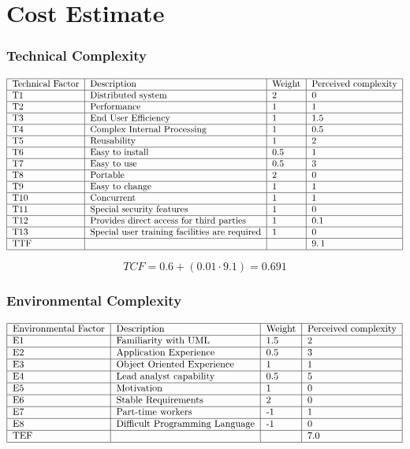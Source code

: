 \documentclass{article}
\begin{document}
\newpage

\part{Cost Estimate}

\section{Technical Complexity}

\[
\begin{tabular}{|l|l|l|l|}
\hline
Technical Factor & Description & Weight & Perceived complexity \\ \hline
T1 & Distributed system & 2 & 0 \\ \hline
T2 & Performance & 1 & 1 \\ \hline
T3 & End User Efficiency & 1 & 1.5 \\ \hline
T4 & Complex Internal Processing & 1 & 0.5 \\ \hline
T5 & Reusability & 1 & 2 \\ \hline
T6 & Easy to install & 0.5 & 1 \\ \hline
T7 & Easy to use & 0.5 & 3 \\ \hline
T8 & Portable & 2 & 0 \\ \hline
T9 & Easy to change & 1 & 1 \\ \hline
T10 & Concurrent & 1 & 1 \\ \hline
T11 & Special security features & 1 & 0 \\ \hline
T12 & Provides direct access for third parties & 1 & 0.1 \\ \hline
T13 & Special user training facilities are required & 1 & 0 \\ \hline
TTF &  &  & $9.\,\allowbreak 1$ \\ \hline
\end{tabular}%
\]

\[
TCF=0.6+\left( 0.01\cdot 9.1\right) =\allowbreak 0.691 
\]%
$\,$
\newpage
\section{Environmental Complexity}

\[
\begin{tabular}{|l|l|l|l|}
\hline
Environmental Factor & Description & Weight & Perceived complexity \\ \hline
E1 & Familiarity with UML & 1.5 & 2 \\ \hline
E2 & Application Experience & 0.5 & 3 \\ \hline
E3 & Object Oriented Experience & 1 & 1 \\ \hline
E4 & Lead analyst capability & 0.5 & 5 \\ \hline
E5 & Motivation & 1 & 0 \\ \hline
E6 & Stable Requirements & 2 & 0 \\ \hline
E7 & Part-time workers & -1 & 1 \\ \hline
E8 & Difficult Programming Language & -1 & 0 \\ \hline
TEF &  &  & $7.0$ \\ \hline
\end{tabular}%
\]
\end{document}
